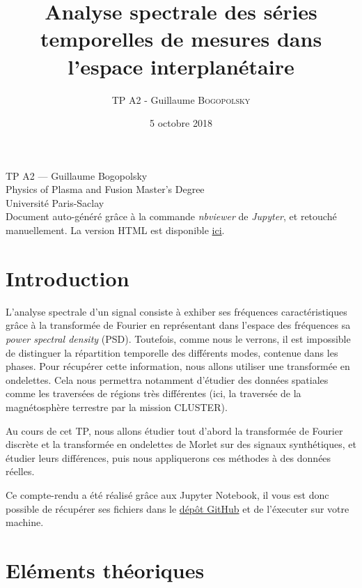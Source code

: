 \documentclass[11pt]{article}
\title{Analyse spectrale des séries temporelles de mesures dans l'espace interplanétaire}
\author{TP A2 - Guillaume \textsc{Bogopolsky}}
\date{5 octobre 2018}
\begin{document}
    
    
    \maketitle
    
    
    \begin{flushleft}
TP A2 --- Guillaume Bogopolsky\\
Physics of Plasma and Fusion Master's Degree\\
Université Paris-Saclay\\

Document auto-généré grâce à la commande \emph{nbviewer} de \emph{Jupyter}, et retouché manuellement. 
La version HTML est disponible \href{http://nbviewer.jupyter.org/github/gbogopolsky/spectral-analysis-astro/blob/master/Rapport.ipynb?flush_cache=true}{ici}.
    \end{flushleft}

    \hypertarget{introduction}{%
\section{Introduction}\label{introduction}}

    L'analyse spectrale d'un signal consiste à exhiber ses fréquences
caractéristiques grâce à la transformée de Fourier en représentant dans
l'espace des fréquences sa \emph{power spectral density} (PSD).
Toutefois, comme nous le verrons, il est impossible de distinguer la
répartition temporelle des différents modes, contenue dans les phases.
Pour récupérer cette information, nous allons utiliser une transformée
en ondelettes. Cela nous permettra notamment d'étudier des données
spatiales comme les traversées de régions très différentes (ici, la
traversée de la magnétosphère terrestre par la mission CLUSTER).

Au cours de cet TP, nous allons étudier tout d'abord la transformée de
Fourier discrète et la transformée en ondelettes de Morlet sur des
signaux synthétiques, et étudier leurs différences, puis nous
appliquerons ces méthodes à des données réelles.

Ce compte-rendu a été réalisé grâce aux Jupyter Notebook, il vous est
donc possible de récupérer ses fichiers dans le
\href{https://github.com/gbogopolsky/spectral-analysis-astro}{dépôt
GitHub} et de l'éxecuter sur votre machine.

    \hypertarget{eluxe9ments-thuxe9oriques}{%
\section{Eléments théoriques}\label{eluxe9ments-thuxe9oriques}}
\end{document}
